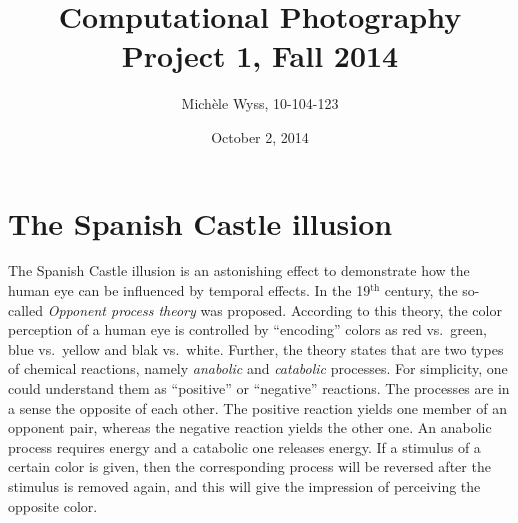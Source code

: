 \documentclass[a4paper]{article}
\title{Computational Photography \\ Project 1, Fall 2014}
\author{Mich\`ele Wyss, 10-104-123}
\date{October 2, 2014}
\begin{document}
\maketitle
\section{The Spanish Castle illusion}
The Spanish Castle illusion is an astonishing effect to demonstrate how the human eye can be influenced by temporal effects.  In the 19$^{\text{th}}$ century, the so-called \emph{Opponent process theory} was proposed. According to this theory, the color perception of a human eye is controlled by ``encoding'' colors as red vs.\ green,  blue vs.\ yellow and blak vs.\ white. Further, the theory states that are two types of chemical reactions, namely \emph{anabolic} and \emph{catabolic} processes. For simplicity, one could understand them as ``positive'' or ``negative'' reactions. The processes are in a sense the opposite of each other. The positive reaction yields one member of an opponent pair, whereas the negative reaction yields the other one. An anabolic process requires energy and a catabolic one releases energy. If a stimulus of a certain color is given, then the corresponding process will be reversed after the stimulus is removed again, and this will give the impression of perceiving the opposite color.
\end{document}
